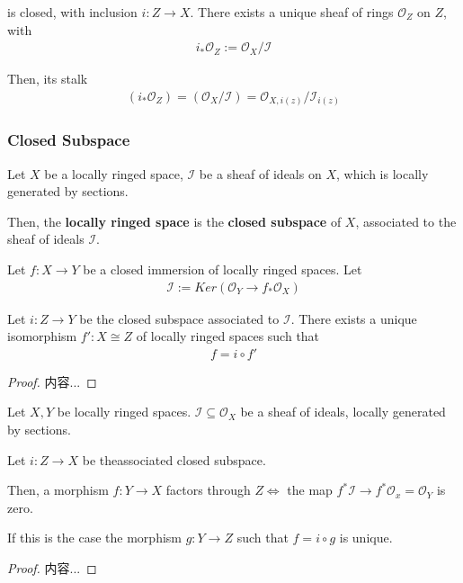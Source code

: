\documentclass[Total.tex]{subfiles}
\begin{document}
				is closed, with inclusion $i:Z\rightarrow X$. There exists a unique sheaf of rings $\mathcal{O}_Z$ on $Z$, with
				\begin{gather*}
					i_*\mathcal{O}_Z:=\mathcal{O}_X/\mathcal{I}
				\end{gather*}
				
				Then, its stalk
				\begin{gather*}
					(i_*\mathcal{O}_Z)=(\mathcal{O}_X/\mathcal{I})=\mathcal{O}_{X,i(z)}/\mathcal{I}_{i(z)}
				\end{gather*}
				
				\subsubsection{Closed Subspace}
				\begin{Def}
					Let $X$ be a locally ringed space, $\mathcal{I}$ be a sheaf of ideals on $X$, which is locally generated by sections.
					
					Then, the \textbf{locally ringed space} is the \textbf{closed subspace} of $X$, associated to the sheaf of ideals $\mathcal{I}$.
				\end{Def}
				
				\begin{lemma}
					Let $f:X\rightarrow Y$ be a closed immersion of locally ringed spaces. Let 
					\begin{gather*}
						\mathcal{I}:=Ker(\mathcal{O}_Y\rightarrow f_*\mathcal{O}_X)
					\end{gather*}
					
					Let $i:Z\rightarrow Y$ be the closed subspace associated to $\mathcal{I}$. There exists a unique isomorphism $f':X\cong Z$ of locally ringed spaces such that
					\begin{gather*}
						f=i\circ f'
					\end{gather*}
				\end{lemma}
				\begin{proof}
					内容...
				\end{proof}
				\begin{lemma}
					Let $X,Y$ be locally ringed spaces. $\mathcal{I}\subseteq \mathcal{O}_X$ be a sheaf of ideals, locally generated by sections.
					
					Let $i:Z\rightarrow X$ be theassociated closed subspace. 
					
					Then, a morphism $f:Y\rightarrow X$ factors through $Z\Leftrightarrow$ the map $f^*\mathcal{I}\rightarrow f^*\mathcal{O}_x=\mathcal{O}_Y$ is zero.
					
					If this is the case the morphism $g:Y\rightarrow Z$ such that $f=i\circ g$ is unique.
				\end{lemma}
				\begin{proof}
					内容...
				\end{proof}
				
\end{document}
